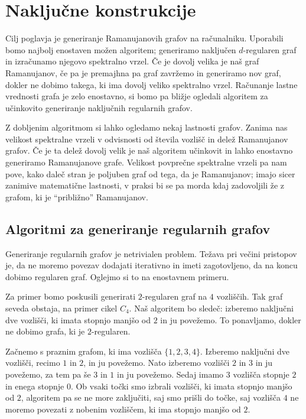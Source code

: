 \section{Naključne konstrukcije}
Cilj poglavja je generiranje Ramanujanovih grafov na računalniku. Uporabili bomo najbolj enostaven možen algoritem; generiramo naključen \(d\)-regularen graf in izračunamo njegovo spektralno vrzel. Če je dovolj velika je naš graf Ramanujanov, če pa je premajhna pa graf zavržemo in generiramo nov graf, dokler ne dobimo takega, ki ima dovolj veliko spektralno vrzel. Računanje lastne vrednosti grafa je zelo enostavno, si bomo pa bližje ogledali algoritem za učinkovito generiranje naključnih regularnih grafov.

Z dobljenim algoritmom si lahko ogledamo nekaj lastnosti grafov. Zanima nas velikost spektralne vrzeli v odvisnosti od števila vozlišč in delež Ramanujanov grafov. Če je ta delež dovolj velik je naš algoritem učinkovit in lahko enostavno generiramo Ramanujanove grafe. Velikost povprečne spektralne vrzeli pa nam pove, kako daleč stran je poljuben graf od tega, da je Ramanujanov; imajo sicer zanimive matematične lastnosti, v praksi bi se pa morda kdaj zadovoljili že z grafom, ki je ``približno'' Ramanujanov.

\subsection{Algoritmi za generiranje regularnih grafov}
Generiranje regularnih grafov je netrivialen problem. Težava pri večini pristopov je, da ne moremo povezav dodajati iterativno in imeti zagotovljeno, da na koncu dobimo regularen graf. Oglejmo si to na enostavnem primeru.

\begin{primer}
    Za primer bomo poskusili generirati \(2\)-regularen graf na \(4\) vozliščih. Tak graf seveda obstaja, na primer cikel \(C_4\). Naš algoritem bo sledeč: izberemo naključni dve vozlišči, ki imata stopnjo manjšo od \(2\) in ju povežemo. To ponavljamo, dokler ne dobimo grafa, ki je \(2\)-regularen.

    Začnemo s praznim grafom, ki ima vozlišča \(\{1, 2, 3, 4\}\). Izberemo naključni dve vozlišči, recimo \(1\) in \(2\), in ju povežemo. Nato izberemo vozlišči \(2\) in \(3\) in ju povežemo, za tem pa še \(3\) in \(1\) in ju povežemo. Sedaj imamo \(3\) vozlišča stopnje \(2\) in enega stopnje \(0\). Ob vsaki točki smo izbrali vozlišči, ki imata stopnjo manjšo od \(2\), algoritem pa se ne more zaključiti, saj smo prišli do točke, saj vozlišča \(4\) ne moremo povezati z nobenim vozliščem, ki ima stopnjo manjšo od \(2\).
\end{primer}

